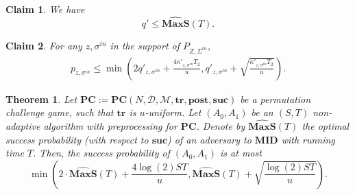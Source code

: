 \documentclass[10pt,a4paper]{amsart}
\newtheorem{theorem}{Theorem}
\newtheorem{claim}{Claim}
\newcommand{\MAXS}{\boldsymbol{MaxS}}
\newcommand{\MID}{\boldsymbol{MID}}
\newcommand{\PC}{\boldsymbol{PC}}
\newcommand{\POST}{\boldsymbol{post}}
\newcommand{\SECS}{{\mathcal{D}}}
\newcommand{\SUC}{\boldsymbol{suc}}
\newcommand{\TR}{\boldsymbol{tr}}
\begin{document}
\begin{claim} We have
\label{clm:basic with advice}
$$
q' 
\leq 
\widehat{\MAXS}(T).$$
\end{claim}

\begin{claim} \label{clm:advice main-eq2}
For any $z,\sigma^{in}$ in the support of $P_{Z,\Sigma^{in}}$,
\begin{align*} 
p_{z, \sigma^{in} }
\leq 
\min \left(
2 q'_{z, \sigma^{in} }
+ 
\frac{4 \kappa'_{z, \sigma^{in} } T_2 }{u},
q'_{z,\sigma^{in} } + \sqrt{\frac{\kappa'_{z,  \sigma^{in} } T_2} {{u}}} 
\right).
\end{align*}
\end{claim}

\begin{theorem} \label{thm:pc to middle}
Let $\PC := \PC(N,\SECS,\mathcal{M},\TR,\POST,\SUC)$ be a permutation challenge game, such that 
$\TR$ is $u$-uniform.
Let $(A_0,A_1)$ be an $(S,T)$ non-adaptive algorithm with preprocessing for $\PC$.
Denote by $\widehat{\MAXS}(T)$ the optimal success probability (with respect to $\SUC$) of an adversary to $\MID$ with running time $T$.
Then, the success probability of $(A_0,A_1)$ is at most
\[
\min \left(2\cdot \widehat{\MAXS}(T) + \frac{4\log(2) S T }{u}, \widehat{\MAXS}(T) + 
\sqrt{\frac{\log(2) ST} {{u}}}\right).
\]
\end{theorem}
\end{document}
